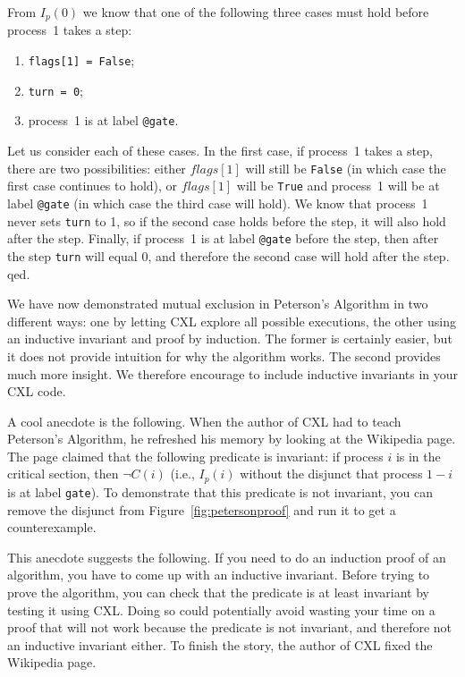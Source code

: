 \documentclass{report}
\begin{document}
From $I_p(0)$ we know that one of the following three cases must hold before
process~1 takes a step:
\begin{enumerate}
\item \texttt{flags[1] = False};
\item \texttt{turn = 0};
\item process~1 is at label \texttt{@gate}.
\end{enumerate}

Let us consider each of these cases.
In the first case, if process~1 takes a step, there are two possibilities:
either $flags[1]$ will still be \texttt{False} (in which case the first case
continues to hold), or $flags[1]$ will be \texttt{True}
and process~1 will be at label \texttt{@gate} (in which case the third case
will hold).
We know that process~1 never sets \texttt{turn} to 1, so
if the second case holds before the step, it will also hold after the step.
Finally, if process~1 is at label \texttt{@gate} before the step, then after
the step \texttt{turn} will equal 0, and therefore the second case will hold
after the step.  qed.

We have now demonstrated mutual exclusion in Peterson's Algorithm in two
different ways: one by letting CXL explore all possible executions, the
other using an inductive invariant and proof by induction.  The former
is certainly easier, but it does not provide intuition for why the
algorithm works.  The second provides much more insight.  We therefore
encourage to include inductive invariants in your CXL code.

A cool anecdote is the following.  When the author of CXL had to teach
Peterson's Algorithm, he refreshed his memory by looking at the Wikipedia
page.  The page claimed that the following predicate is invariant:
if process $i$ is in the critical section, then $\lnot C(i)$ (i.e.,
$I_p(i)$ without the disjunct that process $1-i$ is at label \texttt{gate}).
To demonstrate that this predicate is not invariant, you can remove the
disjunct from Figure~\ref{fig:petersonproof} and run it to get a
counterexample.

This anecdote suggests the following.  If you need to do an induction
proof of an algorithm, you have to come up with an inductive invariant.
Before trying to prove the algorithm, you can check that the predicate is
at least invariant by testing it using CXL.  Doing so could potentially
avoid wasting your time on a proof that will not work because the
predicate is not invariant, and therefore not an inductive invariant either.
To finish the story, the author of CXL fixed the Wikipedia page.
\end{document}
